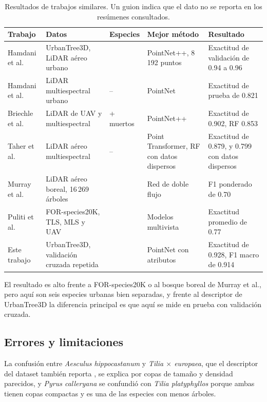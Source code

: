 \documentclass[preprint,12pt]{elsarticle}
\begin{document}
\begin{table}[!htbp]
\centering
\scriptsize
\renewcommand{\arraystretch}{1.1}
\begin{tabular}{>{\raggedright\arraybackslash}p{2.1cm} >{\raggedright\arraybackslash}p{3.3cm} >{\raggedright\arraybackslash}p{1.0cm} >{\raggedright\arraybackslash}p{2.4cm} >{\raggedright\arraybackslash}p{2.8cm}}
\toprule
Trabajo & Datos & Especies & Mejor método & Resultado \\
\midrule
Hamdani et al. \cite{hamdani2026urbantree3d} & UrbanTree3D, LiDAR aéreo urbano & 6 & PointNet++, 8\,192 puntos & Exactitud de validación de 0.94 a 0.96 \\
Hamdani et al. \cite{hamdani2026classification} & LiDAR multiespectral urbano & -- & PointNet & Exactitud de prueba de 0.821 \\
Briechle et al. \cite{briechle2020pointnetpp} & LiDAR de UAV y multiespectral & 3 + muertos & PointNet++ & Exactitud de 0.902, RF 0.853 \\
Taher et al. \cite{taher2026msals} & LiDAR aéreo multiespectral & -- & Point Transformer, RF con datos dispersos & Exactitud de 0.879, y 0.799 con datos dispersos \\
Murray et al. \cite{murray2025dualstream} & LiDAR aéreo boreal, 16\,269 árboles & 4 & Red de doble flujo & F1 ponderado de 0.70 \\
Puliti et al. \cite{puliti2025forspecies} & FOR-species20K, TLS, MLS y UAV & 33 & Modelos multivista & Exactitud promedio de 0.77 \\
Este trabajo & UrbanTree3D, validación cruzada repetida & 6 & PointNet con atributos & Exactitud de 0.928, F1 macro de 0.914 \\
\bottomrule
\end{tabular}
\caption{Resultados de trabajos similares. Un guion indica que el dato no se reporta en los resúmenes consultados.}
\label{tab:literatura}
\end{table}

El resultado es alto frente a FOR-species20K o al bosque boreal de Murray et al., pero aquí son seis especies urbanas bien separadas, y frente al descriptor de UrbanTree3D la diferencia principal es que aquí se mide en prueba con validación cruzada.

\subsection{Errores y limitaciones}

La confusión entre \textit{Aesculus hippocastanum} y \textit{Tilia $\times$ europaea}, que el descriptor del dataset también reporta \cite{hamdani2026urbantree3d}, se explica por copas de tamaño y densidad parecidos, y \textit{Pyrus calleryana} se confundió con \textit{Tilia platyphyllos} porque ambas tienen copas compactas y es una de las especies con menos árboles.
\end{document}
